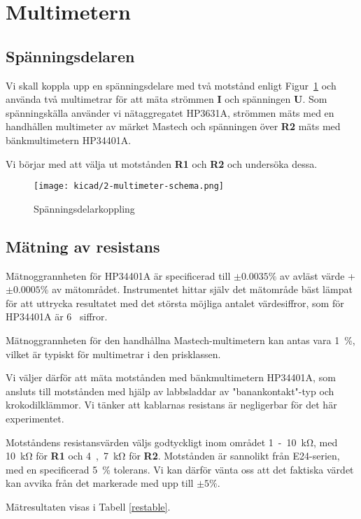 \documentclass[11pt,a4paper]{article}
\begin{document}
\section{Multimetern}\label{}

\subsection{Spänningsdelaren}\label{vdiv1}
Vi skall koppla upp en spänningsdelare med två motstånd enligt 
Figur~\ref{fig:2-mm-schem} och använda två multimetrar för att mäta strömmen 
\textbf{I} och spänningen \textbf{U}. Som spänningskälla använder vi 
nätaggregatet HP3631A, strömmen mäts med en handhållen multimeter av märket
Mastech och spänningen över \textbf{R2} mäts med bänkmultimetern HP34401A.
\par Vi börjar med att välja ut motstånden \textbf{R1} och \textbf{R2} och 
undersöka dessa.

\begin{figure}[htbp]
    \centering
        \texttt{[image: kicad/2-multimeter-schema.png]}
    \caption{Spänningsdelarkoppling}
    \label{fig:2-mm-schem}
\end{figure}


\subsection{Mätning av resistans}\label{vdiv2}
\par Mätnoggrannheten för HP34401A är specificerad till $\pm{}0.0035\%$ av
avläst värde + $\pm{}0.0005\%$ av mätområdet. Instrumentet hittar själv det
mätområde bäst lämpat för att uttrycka resultatet med det största möjliga antalet
värdesiffror, som för HP34401A är \si{6} siffror.
\par Mätnoggrannheten för den handhållna Mastech-multimetern kan antas vara
\si{1\%}, vilket är typiskt för multimetrar i den prisklassen.
\par Vi väljer därför att mäta motstånden med bänkmultimetern HP34401A, som ansluts
till motstånden med hjälp av labbsladdar av "banankontakt"-typ och krokodilklämmor.
Vi tänker att kablarnas resistans är negligerbar för det här experimentet.
\\
\par Motståndens resistansvärden väljs godtyckligt inom området \si{1-10\kohm}, 
med \si{10\kohm} för \textbf{R1} och \si{4,7\kohm} för \textbf{R2}.
Motstånden är sannolikt från E24-serien, med en specificerad \si{5\%} tolerans. Vi kan
därför vänta oss att det faktiska värdet kan avvika från det markerade med upp till
$\pm{}5\%$. 
\par Mätresultaten visas i Tabell \ref{restable}.
\end{document}
